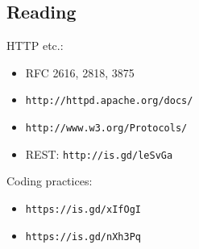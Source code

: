 \documentclass[xga]{xdvislides}
\begin{document}
\subsection{Reading}
HTTP etc.:
\begin{itemize}
	\item RFC 2616, 2818, 3875
	\item \verb+http://httpd.apache.org/docs/+
	\item \verb+http://www.w3.org/Protocols/+
	\item REST: \verb+http://is.gd/leSvGa+
\end{itemize}
\vspace{.5in}
Coding practices:
\begin{itemize}
	\item \verb+https://is.gd/xIfOgI+
	\item \verb+https://is.gd/nXh3Pq+
\end{itemize}
\end{document}

